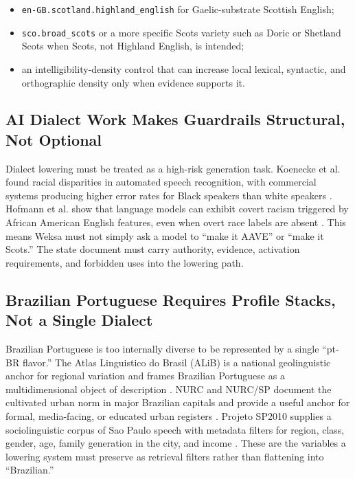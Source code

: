 \documentclass[11pt]{article}
\begin{document}
\begin{itemize}[noitemsep]
  \item \texttt{en-GB.scotland.highland\_english} for Gaelic-substrate Scottish
  English;
  \item \texttt{sco.broad\_scots} or a more specific Scots variety such as
  Doric or Shetland Scots when Scots, not Highland English, is intended;
  \item an intelligibility-density control that can increase local lexical,
  syntactic, and orthographic density only when evidence supports it.
\end{itemize}

\subsection{AI Dialect Work Makes Guardrails Structural, Not Optional}

Dialect lowering must be treated as a high-risk generation task. Koenecke et
al. found racial disparities in automated speech recognition, with commercial
systems producing higher error rates for Black speakers than white speakers
\cite{koenecke2020}. Hofmann et al. show that language models can exhibit covert
racism triggered by African American English features, even when overt race
labels are absent \cite{hofmann2024}. This means Weksa must not simply ask a
model to ``make it AAVE'' or ``make it Scots.'' The state document must carry
authority, evidence, activation requirements, and forbidden uses into the
lowering path.

\subsection{Brazilian Portuguese Requires Profile Stacks, Not a Single Dialect}

Brazilian Portuguese is too internally diverse to be represented by a single
``pt-BR flavor.'' The Atlas Linguistico do Brasil (ALiB) is a national
geolinguistic anchor for regional variation and frames Brazilian Portuguese as a
multidimensional object of description \cite{alibInfo}. NURC and NURC/SP
document the cultivated urban norm in major Brazilian capitals and provide a
useful anchor for formal, media-facing, or educated urban registers
\cite{nurcsp}. Projeto SP2010 supplies a sociolinguistic corpus of Sao Paulo
speech with metadata filters for region, class, gender, age, family generation
in the city, and income \cite{sp2010}. These are the variables a lowering
system must preserve as retrieval filters rather than flattening into
``Brazilian.''
\end{document}
